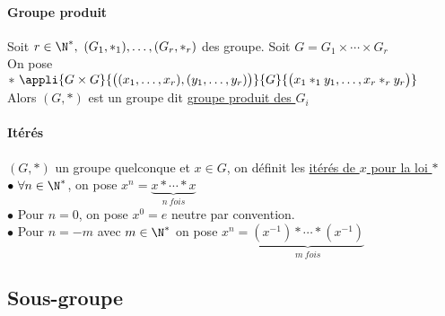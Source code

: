 		\paragraph{Groupe produit}
			Soit $r\in \N^* ,~(G_1,\ast_1),\dots ,(G_r,\ast_r)$ des groupe. Soit $G = G_1\times \cdots \times G_r$\\
			On pose $\ast ~\appli{G\times G}{\big((x_1,\dots ,x_r),(y_1,\dots,y_r)\big)}{G}{\big( x_1\ast_1 y_1 ,\dots , x_r\ast_ry_r\big)}$\\
			Alors \uline{$(G,\ast)$} est un groupe dit \uline{groupe produit des $G_i$} \trait ${}$ \vspace*{-1.5cm} \\ \traitd 
		\paragraph{Itérés}
			$(G,\ast)$ un groupe quelconque et $x\in G$, on définit les \uline{itérés de $x$ pour la loi $\ast$}\\
			\hspace*{2cm} $\bullet ~\forall n\in\N^*$, on pose $x^n = \underbrace{x\ast\cdots \ast x}_{n~fois}$ \\
			\hspace*{2cm} $\bullet$ Pour $n=0$, on pose $x^0=e$ neutre par convention.\\
			\hspace*{2cm} $\bullet$ Pour $n=-m$ avec $m\in\N^*$ on pose $x^n = \underbrace{(x^{-1})\ast\cdots\ast (x^{-1})}_{m~fois}$ \trait \newpage
	\subsection{Sous-groupe}
		\traitd
